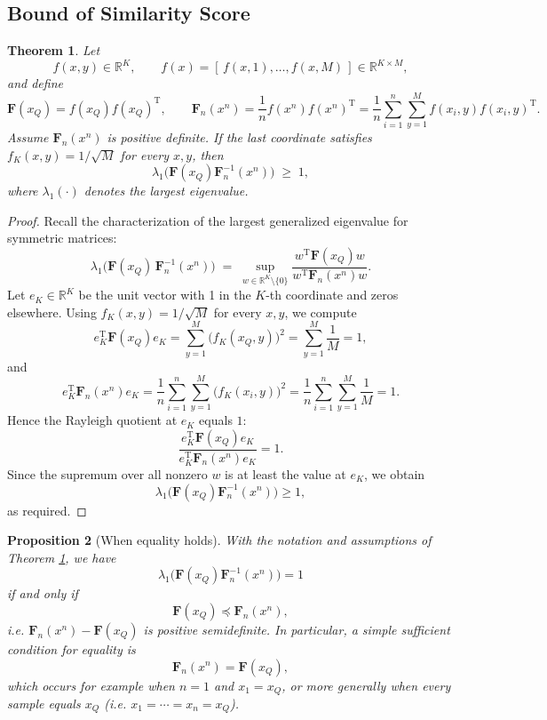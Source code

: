 \documentclass{article} %
\theoremstyle{plain} %
\newtheorem{theorem}{Theorem}[section]      %
\newtheorem{proposition}[theorem]{Proposition}
\begin{document}
\subsection{Bound of Similarity Score}\label{sec:lb_lambda_1}
\begin{theorem}\label{thm:lambda_ge_1}
Let
\[
f(x,y)\in\mathbb R^K,\qquad f(x)=[\,f(x,1),\dots,f(x,M)\,]\in\mathbb R^{K\times M},
\]
and define
\[
\mathbf F(x_Q)=f(x_Q)f(x_Q)^\mathrm{T},\qquad
\mathbf F_n(x^n)=\frac{1}{n}f(x^n)f(x^n)^\mathrm{T}
=\frac{1}{n}\sum_{i=1}^n\sum_{y=1}^M f(x_i,y)f(x_i,y)^\mathrm{T}.
\]
Assume \(\mathbf F_n(x^n)\) is positive definite. If the last coordinate satisfies
\(f_K(x,y)=1/\sqrt{M}\) for every \(x,y\), then
\[
\lambda_1\!\big(\mathbf F(x_Q)\mathbf F_n^{-1}(x^n)\big)\;\ge\;1,
\]
where \(\lambda_1(\cdot)\) denotes the largest eigenvalue.
\end{theorem}
\begin{proof}
Recall the characterization of the largest generalized eigenvalue for symmetric matrices:
\[
\lambda_1\!\big(\mathbf F(x_Q)\,\mathbf F_n^{-1}(x^n)\big)
\;=\;
\sup_{w\in\mathbb R^K\setminus\{0\}}
\frac{w^\mathrm{T} \mathbf F(x_Q) w}{w^\mathrm{T} \mathbf F_n(x^n) w}.
\]
Let \(e_K\in\mathbb R^K\) be the unit vector with 1 in the \(K\)-th coordinate and zeros elsewhere.
Using \(f_K(x,y)=1/\sqrt{M}\) for every \(x,y\), we compute
\[
e_K^\mathrm{T} \mathbf F(x_Q) e_K
= \sum_{y=1}^M \big(f_K(x_Q,y)\big)^2
= \sum_{y=1}^M \frac{1}{M} = 1,
\]
and
\[
e_K^\mathrm{T} \mathbf F_n(x^n) e_K
= \frac{1}{n}\sum_{i=1}^n\sum_{y=1}^M \big(f_K(x_i,y)\big)^2
= \frac{1}{n}\sum_{i=1}^n\sum_{y=1}^M \frac{1}{M}
= 1.
\]
Hence the Rayleigh quotient at \(e_K\) equals \(1\):
\[
\frac{e_K^\mathrm{T} \mathbf F(x_Q) e_K}{e_K^\mathrm{T} \mathbf F_n(x^n) e_K}=1.
\]
Since the supremum over all nonzero \(w\) is at least the value at \(e_K\), we obtain
\[
\lambda_1\!\big(\mathbf F(x_Q)\mathbf F_n^{-1}(x^n)\big)\ge 1,
\]
as required.
\end{proof}

\begin{proposition}[When equality holds]\label{prop:when_eq}
With the notation and assumptions of Theorem \ref{thm:lambda_ge_1}, we have
\[
\lambda_1\!\big(\mathbf F(x_Q)\mathbf F_n^{-1}(x^n)\big)=1
\]
if and only if
\[
\mathbf F(x_Q)\preceq \mathbf F_n(x^n),
\]
i.e. \(\mathbf F_n(x^n)-\mathbf F(x_Q)\) is positive semidefinite. In particular, a simple sufficient condition for equality is
\[
\mathbf F_n(x^n)=\mathbf F(x_Q),
\]
which occurs for example when \(n=1\) and \(x_1=x_Q\), or more generally when every sample equals \(x_Q\) (i.e. \(x_1=\cdots=x_n=x_Q\)).
\end{proposition}
\end{document}
